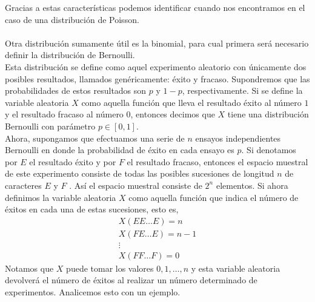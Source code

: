 Gracias a estas características podemos identificar cuando nos encontramos en el caso de una distribución de Poisson. \\\\
Otra distribución sumamente útil es la binomial, para cual primera será necesario definir la distribución de Bernoulli.\\ Esta distribución se define como aquel experimento aleatorio con únicamente dos posibles resultados, llamados genéricamente: éxito y fracaso.
Supondremos que las probabilidades de estos resultados son $p$ y $1-p$, respectivamente. Si se define la variable aleatoria $X$ como aquella función que lleva el resultado éxito al número $1$ y el resultado fracaso al número $0$, entonces decimos que $X$ tiene una distribución Bernoulli con parámetro $p\in[0,1]$.\\
Ahora, supongamos que efectuamos una serie de $n$  ensayos independientes Bernoulli en donde la probabilidad de éxito en cada ensayo es $p$. Si denotamos por $E$ el resultado éxito y por $F$ el resultado fracaso, entonces el espacio muestral de este experimento consiste de todas las posibles sucesiones de longitud $n$ de caracteres $E$ y $F$ . Así el espacio muestral consiste de $2^n$ elementos. Si
ahora definimos la variable aleatoria $X$ como aquella función que indica el número de éxitos en cada una de estas sucesiones, esto es,
\begin{eqnarray*}
    X(EE\ldots E)=n\\ X(FE\ldots E)=n-1\\ \vdots\\X(FF\ldots F)=0
\end{eqnarray*}
Notamos que $X$  puede tomar los valores $0,1,\ldots,n$  y esta variable aleatoria devolverá el número de éxitos al realizar un número determinado de experimentos. Analicemos esto con un ejemplo.

